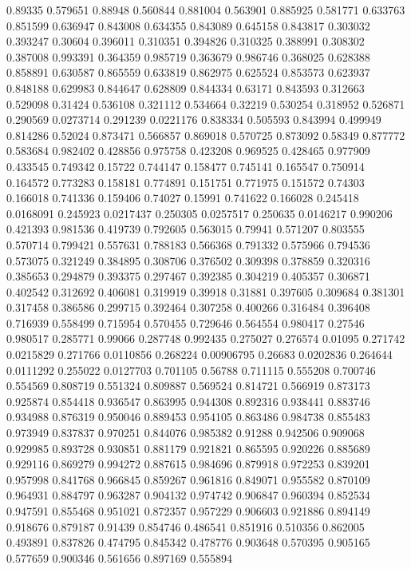 0.89335 0.579651
0.88948 0.560844
0.881004 0.563901
0.885925 0.581771
0.633763 0.851599
0.636947 0.843008
0.634355 0.843089
0.645158 0.843817
0.303032 0.393247
0.30604 0.396011
0.310351 0.394826
0.310325 0.388991
0.308302 0.387008
0.993391 0.364359
0.985719 0.363679
0.986746 0.368025
0.628388 0.858891
0.630587 0.865559
0.633819 0.862975
0.625524 0.853573
0.623937 0.848188
0.629983 0.844647
0.628809 0.844334
0.63171 0.843593
0.312663 0.529098
0.31424 0.536108
0.321112 0.534664
0.32219 0.530254
0.318952 0.526871
0.290569 0.0273714
0.291239 0.0221176
0.838334 0.505593
0.843994 0.499949
0.814286 0.52024
0.873471 0.566857
0.869018 0.570725
0.873092 0.58349
0.877772 0.583684
0.982402 0.428856
0.975758 0.423208
0.969525 0.428465
0.977909 0.433545
0.749342 0.15722
0.744147 0.158477
0.745141 0.165547
0.750914 0.164572
0.773283 0.158181
0.774891 0.151751
0.771975 0.151572
0.74303 0.166018
0.741336 0.159406
0.74027 0.15991
0.741622 0.166028
0.245418 0.0168091
0.245923 0.0217437
0.250305 0.0257517
0.250635 0.0146217
0.990206 0.421393
0.981536 0.419739
0.792605 0.563015
0.79941 0.571207
0.803555 0.570714
0.799421 0.557631
0.788183 0.566368
0.791332 0.575966
0.794536 0.573075
0.321249 0.384895
0.308706 0.376502
0.309398 0.378859
0.320316 0.385653
0.294879 0.393375
0.297467 0.392385
0.304219 0.405357
0.306871 0.402542
0.312692 0.406081
0.319919 0.39918
0.31881 0.397605
0.309684 0.381301
0.317458 0.386586
0.299715 0.392464
0.307258 0.400266
0.316484 0.396408
0.716939 0.558499
0.715954 0.570455
0.729646 0.564554
0.980417 0.27546
0.980517 0.285771
0.99066 0.287748
0.992435 0.275027
0.276574 0.01095
0.271742 0.0215829
0.271766 0.0110856
0.268224 0.00906795
0.26683 0.0202836
0.264644 0.0111292
0.255022 0.0127703
0.701105 0.56788
0.711115 0.555208
0.700746 0.554569
0.808719 0.551324
0.809887 0.569524
0.814721 0.566919
0.873173 0.925874
0.854418 0.936547
0.863995 0.944308
0.892316 0.938441
0.883746 0.934988
0.876319 0.950046
0.889453 0.954105
0.863486 0.984738
0.855483 0.973949
0.837837 0.970251
0.844076 0.985382
0.91288 0.942506
0.909068 0.929985
0.893728 0.930851
0.881179 0.921821
0.865595 0.920226
0.885689 0.929116
0.869279 0.994272
0.887615 0.984696
0.879918 0.972253
0.839201 0.957998
0.841768 0.966845
0.859267 0.961816
0.849071 0.955582
0.870109 0.964931
0.884797 0.963287
0.904132 0.974742
0.906847 0.960394
0.852534 0.947591
0.855468 0.951021
0.872357 0.957229
0.906603 0.921886
0.894149 0.918676
0.879187 0.91439
0.854746 0.486541
0.851916 0.510356
0.862005 0.493891
0.837826 0.474795
0.845342 0.478776
0.903648 0.570395
0.905165 0.577659
0.900346 0.561656
0.897169 0.555894
